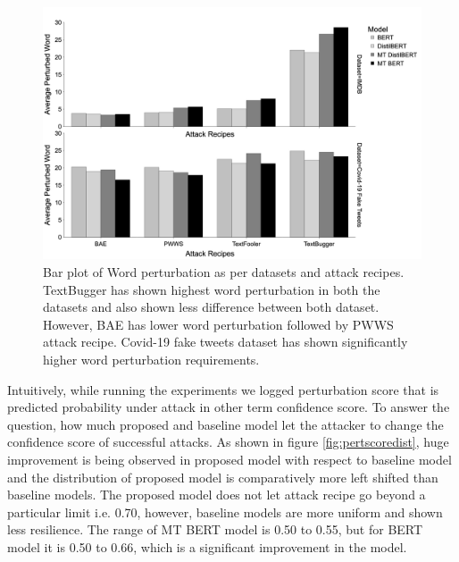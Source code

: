 \documentclass[%
	BCOR=8mm, %
	DIV=12,
	toc=bibliography, %
	toc=listof, %
	oneside, %
	egregdoesnotlikesansseriftitles, %
	]{scrbook}
\begin{document}
\begin{figure}[H]
    \centering
    \includegraphics[width=0.8\linewidth]{img/AvgPertByDataset}
    \caption[Bar plot of Word perturbation]{Bar plot of Word perturbation as per datasets and attack recipes. TextBugger has shown highest word perturbation in both the datasets and also shown less difference between both dataset. However, BAE has lower word perturbation followed by PWWS attack recipe. Covid-19 fake tweets dataset has shown significantly higher word perturbation requirements.  }
    \label{fig:avgpertbyattackrecipes}
\end{figure}
Intuitively, while running the experiments we logged perturbation score that is predicted probability under attack in other term confidence score. To answer the question, how much proposed and baseline model let the attacker to change the confidence score of successful attacks. As shown in figure \ref{fig:pertscoredist}, huge improvement is being observed in proposed model  with respect to baseline model and the distribution of proposed model is comparatively more left shifted than baseline models. The proposed model does not let attack recipe go beyond a particular limit i.e. 0.70, however, baseline models are more uniform and shown less resilience.  The range of MT BERT model is 0.50 to 0.55, but for BERT model it is 0.50 to 0.66, which is a significant improvement in the model.
\end{document}
